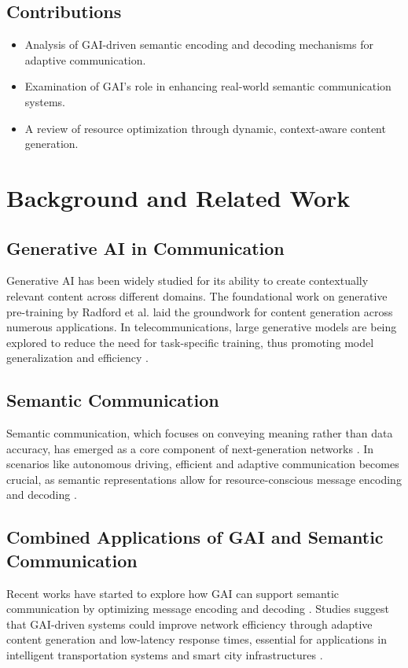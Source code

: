 \documentclass[journal,transmag]{IEEEtran}
\begin{document}
\subsection{Contributions}
\begin{itemize}
    \item Analysis of GAI-driven semantic encoding and decoding mechanisms for adaptive communication.
    \item Examination of GAI’s role in enhancing real-world semantic communication systems.
    \item A review of resource optimization through dynamic, context-aware content generation.
\end{itemize}

\section{Background and Related Work}

\subsection{Generative AI in Communication}
Generative AI has been widely studied for its ability to create contextually relevant content across different domains. The foundational work on generative pre-training by Radford et al. \cite{Radford2018ImprovingLU} laid the groundwork for content generation across numerous applications. In telecommunications, large generative models are being explored to reduce the need for task-specific training, thus promoting model generalization and efficiency \cite{bariah2023largegenerativeaimodels,10614204}.

\subsection{Semantic Communication}
Semantic communication, which focuses on conveying meaning rather than data accuracy, has emerged as a core component of next-generation networks \cite{9955312}. In scenarios like autonomous driving, efficient and adaptive communication becomes crucial, as semantic representations allow for resource-conscious message encoding and decoding \cite{10319661,raha2023generativeaidrivensemanticcommunication}.

\subsection{Combined Applications of GAI and Semantic Communication}
Recent works have started to explore how GAI can support semantic communication by optimizing message encoding and decoding \cite{10447237}. Studies suggest that GAI-driven systems could improve network efficiency through adaptive content generation and low-latency response times, essential for applications in intelligent transportation systems and smart city infrastructures \cite{jiang2024largeaimodelbasedsemantic}.
\end{document}
